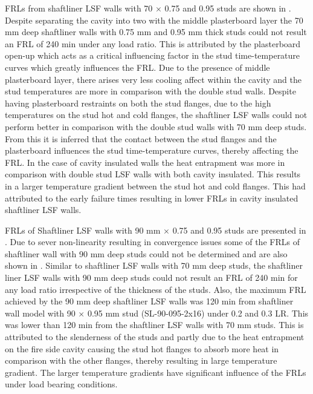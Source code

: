 FRLs from shaftliner LSF walls with 70 $\times$ 0.75 and 0.95 studs are shown in . Despite separating the cavity into two with the middle plasterboard layer the 70 mm deep shaftliner walls with 0.75 mm and 0.95 mm thick studs could not result an FRL of 240 min under any load ratio. This is attributed by the plasterboard open-up which acts as a critical influencing factor in the stud time-temperature curves which greatly influences the FRL. Due to the presence of middle plasterboard layer, there arises very less cooling affect within the cavity and the stud temperatures are more in comparison with the double stud walls. Despite having plasterboard restraints on both the stud flanges, due to the high temperatures on the stud hot and cold flanges, the shaftliner LSF walls could not perform better in comparison with the double stud walls with 70 mm deep studs. From this it is inferred that the contact between the stud flanges and the plasterboard influences the stud time-temperature curves, thereby affecting the FRL. In the case of cavity insulated walls the heat entrapment was more in comparison with double stud LSF walls with both cavity insulated. This results in a larger temperature gradient between the stud hot and cold flanges. This had attributed to the early failure times resulting in lower FRLs in cavity insulated shaftliner LSF walls. 

FRLs of Shaftliner LSF walls with 90 mm $\times$ 0.75 and 0.95 studs are presented in . Due to sever non-linearity resulting in convergence issues some of the FRLs of shaftliner wall with 90 mm deep studs could not be determined and are also shown in . Similar to shaftliner LSF walls with 70 mm deep studs, the shaftliner liner LSF walls with 90 mm deep studs could not result an FRL of 240 min for any load ratio irrespective of the thickness of the studs. Also, the maximum FRL achieved by the 90 mm deep shaftliner LSF walls was 120 min from shaftliner wall model with 90 $\times$ 0.95 mm stud (SL-90-095-2x16) under 0.2 and 0.3 LR. This was lower than 120 min from the shaftliner LSF walls with 70 mm studs. This is attributed to the slenderness of the studs and partly due to the heat entrapment on the fire side cavity causing the stud hot flanges to absorb more heat in comparison with the other flanges, thereby resulting in large temperature gradient. The larger temperature gradients have significant influence of the FRLs under load bearing conditions. 

